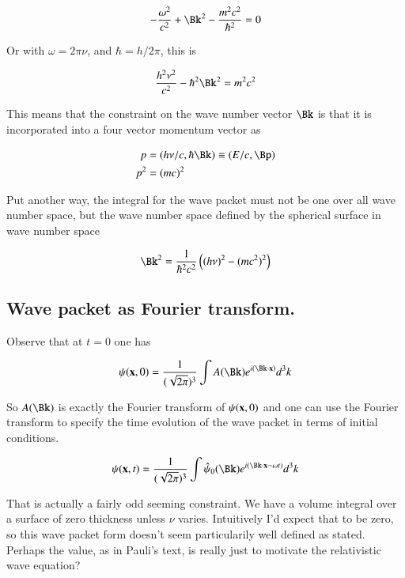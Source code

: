 \documentclass{article}
\begin{document}
\begin{align*}
-\frac{\omega^2}{c^2} + \Bk^2 - \frac{m^2 c^2}{\hbar^2} = 0
\end{align*}

Or with $\omega = 2 \pi \nu$, and $\hbar = h/2\pi$, this is

\begin{align*}
\frac{h^2 \nu^2}{c^2} - \hbar^2 \Bk^2 = {m^2 c^2}
\end{align*}

This means that the constraint on the wave number vector $\Bk$ is that it is incorporated into a four vector momentum vector as

\begin{align*}
p &= (h \nu/c, \hbar \Bk) \equiv (E/c, \Bp)\\
p^2 &= (m c)^2
\end{align*}

Put another way, the integral for the wave packet must not be one over all wave number space, but the wave number space defined by the
spherical surface in wave number space

\begin{align*}
\Bk^2 = \inv{\hbar^2 c^2 }\left( (h \nu)^2 - (m c^2)^2 \right)
\end{align*}

\subsection{ Wave packet as Fourier transform. }

Observe that at $t=0$ one has

\begin{align*}
\psi(\Bx,0) = \inv{(\sqrt{2\pi})^3}\int A(\Bk) e^{ i (\Bk \cdot \Bx)} d^3 k
\end{align*}

So $A(\Bk)$ is exactly the Fourier transform of $\psi(\mathbf{x},0)$
and one can
use the Fourier transform to specify the time evolution of the wave packet in terms of initial conditions.

\begin{align}
\psi(\Bx,t) = \inv{(\sqrt{2\pi})^3}\int \hat{\psi}_0(\Bk) e^{ i (\Bk \cdot \Bx - \omega t)} d^3 k
\end{align}

That is actually a fairly odd seeming constraint.  We have a volume integral over a surface of zero thickness unless $\nu$ varies.  Intuitively
I'd expect that to be zero, so this wave packet form doesn't seem particularily well defined as stated.  Perhaps the value, as
in Pauli's text, is really just to motivate the relativistic wave equation?
\end{document}
